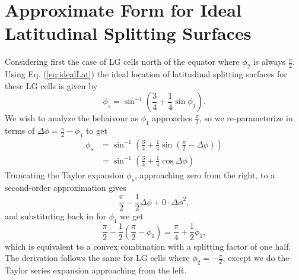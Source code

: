 \section{Approximate Form for Ideal Latitudinal Splitting Surfaces} \label{app:lat}
Considering first the case of LG cells north of the equator where $\phi_{2}$ is always $\frac{\pi}{2}$. Using Eq. (\ref{eq:idealLat}) the ideal location of latitudinal splitting surfaces for these LG cells is given by
%
\begin{equation*} \label{}
\phi_{s} = \sin^{-1} \left( \frac{3}{4} + \frac{1}{4} \sin\phi_{1} \right).
\end{equation*}
%
We wish to analyze the behaivour as $\phi_{1}$ approaches $\frac{\pi}{2}$, so we re-parameterize in terms of $\Delta\phi = \frac{\pi}{2} - \phi_{1}$ to get
%
\begin{align*} \label{}
\phi_{s} & = \sin^{-1} \left( \frac{3}{4} + \frac{1}{4} \sin \left( \frac{\pi}{2} - \Delta\phi \right) \right) \\
& = \sin^{-1} \left( \frac{3}{4} + \frac{1}{4} \cos \Delta\phi \right)
\end{align*}
%
Truncating the Taylor expansion $\phi_{s}$, approaching zero from the right, to a second-order approximation gives
%
\begin{equation*} \label{}
\frac{\pi}{2} -\frac{1}{2}\Delta\phi + 0 \cdot \Delta\phi^{2},
\end{equation*}
%
and substituting back in for $\phi_{1}$ we get
%
\begin{equation*} \label{}
\frac{\pi}{2} -\frac{1}{2} \left( \frac{\pi}{2} - \phi_{1} \right) = \frac{\pi}{4} + \frac{1}{2} \phi_{1},
\end{equation*}
%
which is equivalent to a convex combination with a splitting factor of one half. The derivation follows the same for LG cells where $\phi_{2} = -\frac{\pi}{2}$, except we do the Taylor series expansion approaching from the left.


